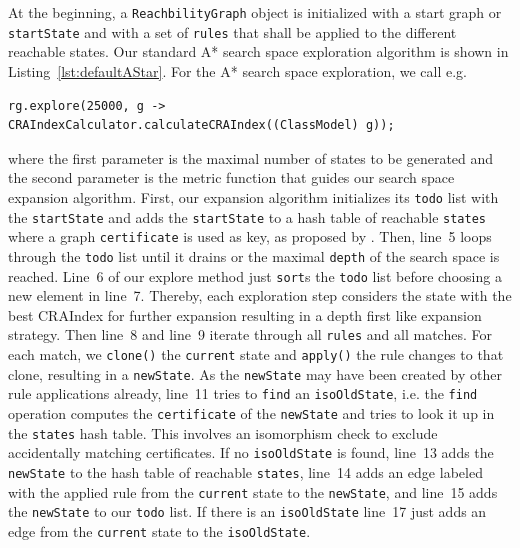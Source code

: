 \documentclass[submission,copyright,creativecommons]{eptcs}
\begin{document}
At the beginning, a \texttt{ReachbilityGraph} object is initialized with a 
start graph or \texttt{startState} and with a set of \texttt{rules} that 
shall be applied to the different reachable states. Our standard A* search space 
exploration algorithm is shown in 
Listing~\ref{lst:defaultAStar}. For the A* search space 
exploration, we call e.g.
\begin{verbatim}
rg.explore(25000, g -> CRAIndexCalculator.calculateCRAIndex((ClassModel) g));
\end{verbatim}
where the first parameter is the maximal number of 
states to be generated and the second parameter is the metric function that guides
our search space expansion algorithm. First, our expansion algorithm initializes 
its \texttt{todo} list with the \texttt{startState} and adds the 
\texttt{startState} to a hash table of reachable \texttt{states} where 
a graph \texttt{certificate} is used as key, as proposed by \cite{rensink2003groove}.
Then, line~5 loops through the \texttt{todo} list until it drains or the maximal 
\texttt{depth} of the search space is reached. 
Line~6 of our explore method just \texttt{sort}s the \texttt{todo} list before choosing 
a new element in line~7. Thereby, each exploration step considers the state with the best 
CRAIndex for further expansion resulting in a depth first like expansion strategy. 
Then line~8 and line~9 iterate through all \texttt{rules} and all matches. 
For each match, we \texttt{clone()} the \texttt{current} state and \texttt{apply()} the 
rule changes to that clone, resulting in a \texttt{newState}. As the \texttt{newState}
may have been created by other rule applications already, line~11 tries to \texttt{find} 
an \texttt{isoOldState}, i.e. the \texttt{find}  operation computes the 
\texttt{certificate} of the \texttt{newState} and tries to look it up in the 
\texttt{states} hash table. This involves an isomorphism check to exclude accidentally 
matching certificates. If no \texttt{isoOldState} is found, line~13 adds the 
\texttt{newState} to the hash table of reachable \texttt{states}, line~14 adds an edge
labeled with the applied rule from the \texttt{current} state to the \texttt{newState}, 
and line~15 adds the \texttt{newState} to our \texttt{todo} list. If there is an 
\texttt{isoOldState} line~17 just adds an edge from the \texttt{current} state to the 
\texttt{isoOldState}.
\end{document}
